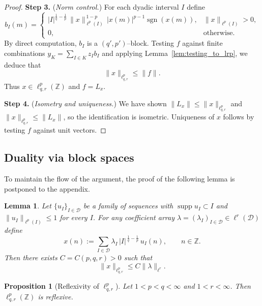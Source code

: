 \documentclass[preprint,12pt]{elsarticle}
\DeclareMathOperator{\supp}{supp}
\newtheorem{lemma}[theorem]{Lemma}
\newtheorem{proposition}[theorem]{Proposition}
\begin{document}
\begin{proof}
\textbf{Step 3.} (\emph{Norm control.}) For each dyadic interval $I$ define 
\[ b_I(m)= \begin{cases} |I|^{\tfrac{1}{q}-\tfrac{1}{p}}\,\|x\|_{\ell^p(I)}^{\,1-p}\,|x(m)|^{p-1}\operatorname{sgn}(x(m)), & \|x\|_{\ell^p(I)}>0, \\ 0,& \text{otherwise}. \end{cases} \] 
By direct computation, $b_I$ is a $(q',p')$–block. Testing $f$ against finite combinations $y_K=\sum_{I\in K} z_I b_I$ and applying Lemma~\ref{lem:testing_to_lrp}, we deduce that 
\[ \|x\|_{\ell_{q,r}^p} \le \|f\|. \] 
Thus $x\in\ell_{q,r}^p(\mathbb{Z})$ and $f=L_x$. \smallskip

\textbf{Step 4.} (\emph{Isometry and uniqueness.}) We have shown $\|L_x\|\le \|x\|_{\ell_{q,r}^p}$ and $\|x\|_{\ell_{q,r}^p}\le \|L_x\|$, so the identification is isometric. Uniqueness of $x$ follows by testing $f$ against unit vectors. 
\end{proof}

\subsection{Duality via block spaces} 
To maintain the flow of the argument, the proof of the following lemma is postponed to the appendix.
\begin{lemma}\label{lem:key-appendix}
Let $\{u_{I}\}_{I\in\mathcal D}$ be a family of sequences with $\supp  u_I\subset I$ and $\|u_I\|_{\ell^{p}(I)}\le1$ for every $I$. For any coefficient array $\lambda=(\lambda_I)_{I\in\mathcal D}\in\ell^{r}(\mathcal D)$ define
\[
x(n):=\sum_{I\in\mathcal D}\lambda_I\,|I|^{\,\frac{1}{q}-\frac{1}{p}}\,u_I(n),\qquad n\in\mathbb Z.
\]
Then there exists $C=C(p,q,r)>0$ such that
\[
\|x\|_{\ell^{p}_{q,r}}\le C\|\lambda\|_{\ell^{r}}.
\]
\end{lemma}
\begin{proposition}[Reflexivity of $\ell^{p}_{q,r}$]\label{prop:reflexivity-lpqr}
Let $1<p<q<\infty$ and $1<r<\infty$. Then $\ell^{p}_{q,r}(\mathbb Z)$ is reflexive.
\end{proposition}
\end{document}
